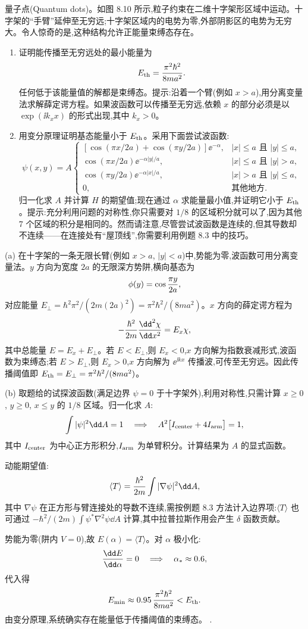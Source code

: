 \begin{question}
量子点(Quantum dots)。如图 8.10 所示,粒子约束在二维十字架形区域中运动。十字架的“手臂”延伸至无穷远;十字架区域内的电势为零,外部阴影区的电势为无穷大。令人惊奇的是,这种结构允许正能量束缚态存在。
\begin{enumerate}
\item 证明能传播至无穷远处的最小能量为
\[
E_{\rm th}=\frac{\pi^2\hbar^2}{8ma^2}.
\]
任何低于该能量值的解都是束缚态。提示:沿着一个臂(例如 $x>a$),用分离变量法求解薛定谔方程。如果波函数可以传播至无穷远,依赖 $x$ 的部分必须是以 $\exp(\ii k_xx)$ 的形式出现,其中 $k_x>0$。
\item 用变分原理证明基态能量小于 $E_{\rm th}$。采用下面尝试波函数:
\[
\psi(x,y)=A\begin{cases}
[\cos(\pi x/2a)+\cos(\pi y/2a)]\ee^{-\alpha}, & |x|\le a\text{ 且 }|y|\le a,\\
\cos(\pi x/2a)\ee^{-\alpha |y|/a}, & |x|\le a\text{ 且 }|y|>a,\\
\cos(\pi y/2a)\ee^{-\alpha |x|/a}, & |x|>a\text{ 且 }|y|\le a,\\
0, & \text{其他地方}.
\end{cases}
\]
归一化求 $A$ 并计算 $H$ 的期望值;现在通过 $\alpha$ 求能量最小值,并证明它小于 $E_{\rm th}$。提示:充分利用问题的对称性,你只需要对 $1/8$ 的区域积分就可以了,因为其他 7 个区域的积分是相同的。然而请注意,尽管尝试波函数是连续的,但其导数却不连续——在连接处有“屋顶线”,你需要利用例题 8.3 中的技巧。
\end{enumerate}
\end{question}
\begin{solution}
(a) 在十字架的一条无限长臂(例如 $x>a$, $|y|<a$)中,势能为零,波函数可用分离变量法。$y$ 方向为宽度 $2a$ 的无限深方势阱,横向基态为
\[
\phi(y)=\cos{\pi y\over2a},
\]
对应能量 $E_\perp=\hbar^2\pi^2/(2m(2a)^2)=\pi^2\hbar^2/(8ma^2)$。$x$ 方向的薛定谔方程为
\[
-{\hbar^2\over2m}{\dd^2\chi\over\dd x^2}=E_x\chi,
\]
其中总能量 $E=E_x+E_\perp$。若 $E<E_\perp$,则 $E_x<0$,$x$ 方向解为指数衰减形式,波函数为束缚态;若 $E>E_\perp$,则 $E_x>0$,$x$ 方向解为 $\ee^{\ii kx}$ 传播波,可传至无穷远。因此传播阈值即 $E_{\rm th}=E_\perp=\pi^2\hbar^2/(8ma^2)$。

(b) 取题给的试探波函数(满足边界 $\psi=0$ 于十字架外),利用对称性,只需计算 $x\ge0$, $y\ge0$, $x\le y$ 的 $1/8$ 区域。归一化求 $A$:
\[
\int|\psi|^2\dd A=1\quad\Longrightarrow\quad
A^2\bigl[I_{\rm center}+4I_{\rm arm}\bigr]=1,
\]
其中 $I_{\rm center}$ 为中心正方形积分,$I_{\rm arm}$ 为单臂积分。计算结果为 $A$ 的显式函数。

动能期望值:
\[
\langle T\rangle={\hbar^2\over2m}\int |\nabla\psi|^2\dd A,
\]
其中 $\nabla\psi$ 在正方形与臂连接处的导数不连续,需按例题 8.3 方法计入边界项:$\langle T\rangle$ 也可通过 $-\hbar^2/(2m)\int\psi^*\nabla^2\psi\dd A$ 计算,其中拉普拉斯作用会产生 $\delta$ 函数贡献。

势能为零(阱内 $V=0$),故 $E(\alpha)=\langle T\rangle$。对 $\alpha$ 极小化:
\[
{\dd E\over\dd\alpha}=0\quad\Longrightarrow\quad\alpha_*\approx0.6,
\]
代入得
\[
E_{\min}\approx0.95\,{\pi^2\hbar^2\over8ma^2}<E_{\rm th}.
\]
由变分原理,系统确实存在能量低于传播阈值的束缚态。
.
\end{solution}

